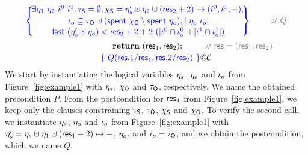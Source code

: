 \[{{\begin{array}{c}
\spec{\!\!\!\!
\begin{array}{c}
\exists \gist_1~\gist_2~\iknh^0~\iknh^1 \ldot     
%
\tkns = \emptyset \aand 
\hists = \gists' \hunion \gist_2 \hunion (\res_2 + 2)\mapsto (\iknh^0, \iknh^1, -)\aand\hbox{}\\[2pt] 
  \ikno \subseteq \tkno \hunion (\Tomb~\histo \setminus \Tomb~\gisto),  \Ic{\gisto}{\ikno},\\[1pt]
    \last~(\gists' \hunion \gisto) < \res_2 + 2 + 2 \ (|\iknh^0 \cap \ikno^0|\!+\!|\iknh^1 \cap
    \ikno^1|) 
\end{array}
\!\!\!\!\!}~\comm{Q}
\\\\[-7pt]
~~~~~~~~~~~~~~~~~~~~~~~~~~\kw{return}~(\res_1, \res_2); ~\comm{\res = (\res_1, \res_2)}
\\[2pt]
\spec{~Q(\res.1/\res_1, \res.2/\res_2)~}@\ccon
\end{array}
}} 
\]
%
We start by instantiating the logical variables $\eta_s$, $\eta_o$ and
$\iota_o$ from Figure~\ref{fig:example1} with $\eta_s$, $\chi_{\mathsf{O}}$ and
$\tau_{\mathsf{O}}$, respectively. We name the obtained precondition $P$.
%
From the postcondition for $\mathsf{res}_1$ from Figure~\ref{fig:example1}, we
keep only the clauses constraining $\tau_{\mathsf{S}}$, $\tau_{\mathsf{O}}$, $\chi_{\mathsf{S}}$ and
$\chi_{\mathsf{O}}$. To verify the second call, we instantiate $\eta_s$,
$\eta_o$ and $\iota_o$ from Figure~\ref{fig:example1} with $\gists' =
\gists \hunion \gist_1 \hunion (\res_1 + 2)\mapsto -$, $\eta_o$, and
$\iota_o = \tau_{\mathsf{O}}$, and we obtain the postcondition, which we name $Q$.


